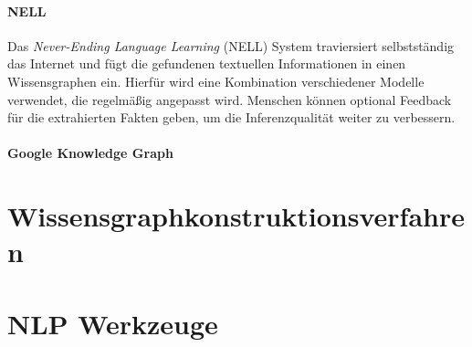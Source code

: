 \paragraph{NELL}
Das \textit{Never-Ending Language Learning} (NELL) System traviersiert selbstständig das Internet und fügt die gefundenen textuellen Informationen in einen Wissensgraphen ein.
Hierfür wird eine Kombination verschiedener Modelle verwendet, die regelmäßig angepasst wird.
Menschen können optional Feedback für die extrahierten Fakten geben, um die Inferenzqualität weiter zu verbessern.

\paragraph{Google Knowledge Graph}

\section{Wissensgraphkonstruktionsverfahren}
\label{sec:related:kbc}

\section{NLP Werkzeuge}
\label{sec:related:nlp}
